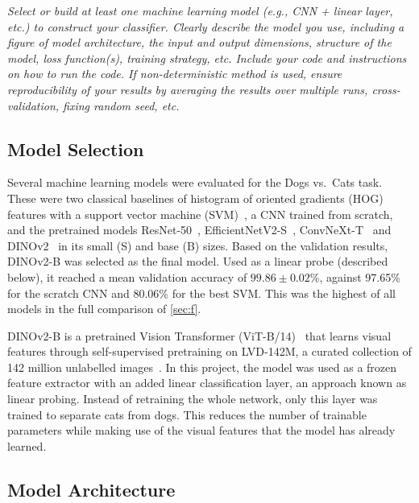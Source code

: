 \documentclass[11pt,a4paper]{article}
\newenvironment{question}
  {\par\smallskip\noindent\begin{lrbox}{\questionbox}%
   \begin{minipage}{\dimexpr\linewidth-2\fboxsep-2\fboxrule\relax}\small\itshape}
  {\end{minipage}\end{lrbox}%
   \fcolorbox{gray!45}{gray!7}{\usebox{\questionbox}}\par\smallskip}
\newcommand{\pct}[1]{#1\%}
\newcommand{\pmpct}[2]{$#1 \pm #2$\%}
\begin{document}
\begin{question}
Select or build at least one machine learning model (e.g., CNN + linear layer, etc.) to construct your classifier. Clearly describe the model you use, including a figure of model architecture, the input and output dimensions, structure of the model, loss function(s), training strategy, etc. Include your code and instructions on how to run the code. If non-deterministic method is used, ensure reproducibility of your results by averaging the results over multiple runs, cross-validation, fixing random seed, etc.
\end{question}

\subsection*{Model Selection}

Several machine learning models were evaluated for the Dogs vs.\ Cats task. These were two classical baselines of histogram of oriented gradients (HOG) features with a support vector machine (SVM)~\cite{dalal2005hog,cortes1995svm}, a CNN trained from scratch, and the pretrained models ResNet-50~\cite{he2016resnet}, EfficientNetV2-S~\cite{tan2021efficientnetv2}, ConvNeXt-T~\cite{liu2022convnext} and DINOv2~\cite{oquab2024dinov2} in its small (S) and base (B) sizes. Based on the validation results, DINOv2-B was selected as the final model. Used as a linear probe (described below), it reached a mean validation accuracy of \pmpct{99.86}{0.02}, against \pct{97.65} for the scratch CNN and \pct{80.06} for the best SVM. This was the highest of all models in the full comparison of \cref{sec:f}.

DINOv2-B is a pretrained Vision Transformer (ViT-B/14)~\cite{dosovitskiy2021vit} that learns visual features through self-supervised pretraining on LVD-142M, a curated collection of 142 million unlabelled images~\cite{oquab2024dinov2}. In this project, the model was used as a frozen feature extractor with an added linear classification layer, an approach known as linear probing. Instead of retraining the whole network, only this layer was trained to separate cats from dogs. This reduces the number of trainable parameters while making use of the visual features that the model has already learned.

\subsection*{Model Architecture}
\end{document}
